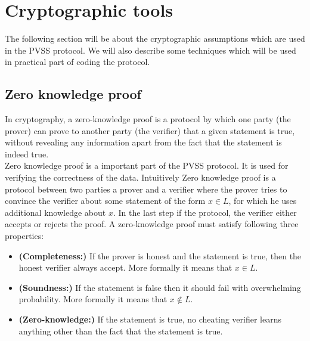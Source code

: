 \section{Cryptographic tools}
The following section will be about the cryptographic assumptions which are used in the PVSS protocol. We will also describe some techniques which will be used in practical part of coding the protocol.


\subsection{Zero knowledge proof} %
In cryptography, a zero-knowledge proof is a protocol by which one party (the prover) can prove to another party (the verifier) that a given statement is true, without revealing any information apart from the fact that the statement is indeed true.\\

\noindent
Zero knowledge proof is a important part of the PVSS protocol. It is used for verifying the correctness of the data. Intuitively Zero knowledge proof is a protocol between two parties a prover and a verifier where the prover tries to convince the verifier about some statement of the form $x \in L$, for which he uses additional knowledge about $x$. In the last step if the protocol, the verifier either accepts or rejects the proof. A zero-knowledge proof must satisfy following three properties:

\begin{itemize}
\item  \textnormal{\textbf{(Completeness:)}} If the prover is honest and the statement is true, then the honest verifier always accept. More formally it means that $x \in L$.
\item    \textnormal{\textbf{(Soundness:)}} If the statement is false then it should fail with overwhelming probability. More formally it means that $x \not\in L$.
\item   \textnormal{\textbf{(Zero-knowledge:)}} If the statement is true, no cheating verifier learns anything other than the fact that the statement is true.
\end{itemize}


